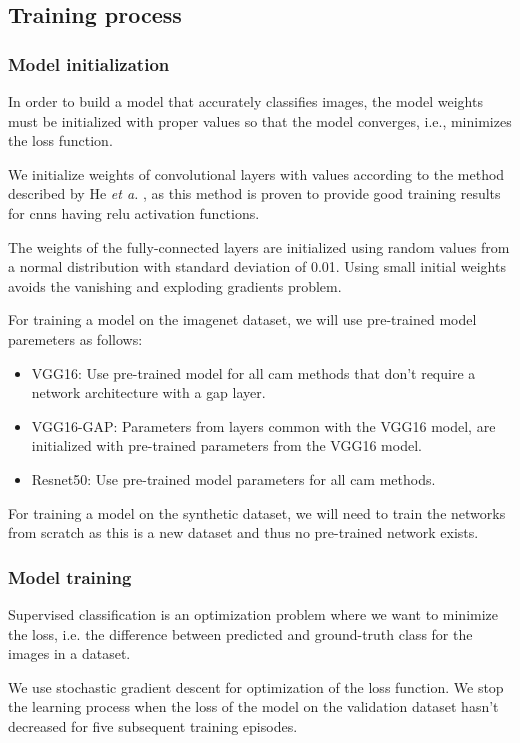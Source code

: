 \subsection{Training process}
\subsubsection{Model initialization}
In order to build a model that accurately classifies images, the model weights must be initialized with proper values so that the model converges, i.e., minimizes the loss function.

We initialize weights of convolutional layers with values according to the method described by He \textit{et a.} \cite{he2015delving}, as this method is proven to provide good training results for \acrshort{cnn}s having \acrshort{relu} activation functions.

The weights of the fully-connected layers are initialized using random values from a normal distribution with standard deviation of 0.01. Using small initial weights avoids the vanishing and exploding gradients problem.

For training a model on the imagenet dataset, we will use pre-trained model paremeters as follows:
\begin{itemize}
    \item VGG16: Use pre-trained model for all \acrshort{cam} methods that don't require a network architecture with a \acrshort{gap} layer.
    \item VGG16-GAP: Parameters from layers common with the VGG16 model, are initialized with pre-trained parameters from the VGG16 model.
    \item Resnet50: Use pre-trained model parameters for all \acrshort{cam} methods.
\end{itemize}

For training a model on the synthetic dataset, we will need to train the networks from scratch as this is a new dataset and thus no pre-trained network exists.

\subsubsection{Model training}
Supervised classification is an optimization problem where we want to minimize the loss, i.e. the difference between predicted and ground-truth class for the images in a dataset.

We use stochastic gradient descent for optimization of the loss function. We stop the learning process when the loss of the model on the validation dataset hasn't decreased for five subsequent training episodes.

